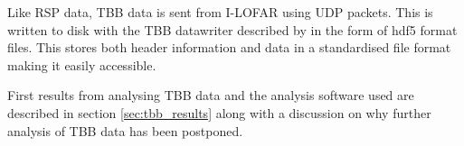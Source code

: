 Like RSP data, TBB data is sent from I-LOFAR using UDP packets. This is written to disk with the TBB datawriter described by \cite{Veen2015} in the form of hdf5 format files. This stores both header information and data in a standardised file format making it easily accessible.

First results from analysing TBB data and the analysis software used are described in section \ref{sec:tbb_results} along with a discussion on why further analysis of TBB data has been postponed. 




